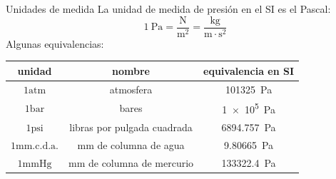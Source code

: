 \documentclass[aspectratio=169]{beamer}
\begin{document}
\begin{frame}{Unidades de medida} 
La unidad de medida de presión en el SI es el Pascal:
    \begin{equation*}
        \SI{1}{\pascal} = \dfrac{\si{\newton}}{\si{\meter\squared}} = \dfrac{\si{\kilogram}}{\si{\meter\cdot \second\squared}}
    \end{equation*}
Algunas equivalencias:
\begin{table}[c]
    \begin{tabular}{ccc}
        \toprule
        unidad & nombre & equivalencia en SI \\
        \midrule
        $1\mathrm{atm}$ & atmosfera & \SI{101325}{\pascal} \\
        $1\mathrm{bar}$ & bares & \SI{1e5}{\pascal}\\
        $1\mathrm{psi}$ & libras por pulgada cuadrada& \SI{6894,757}{\pascal} \\
        $1\mathrm{mm.c.d.a.}$ & mm de columna de agua & \SI{9.80665}{\pascal} \\
        $1\mathrm{mmHg}$ & mm de columna de mercurio & \SI{133322.4}{\pascal} \\
        \bottomrule
    \end{tabular}
    \label{tab:unid}
\end{table}
\end{frame}
\end{document}
